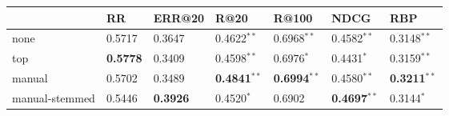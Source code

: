 \begin{tabular}{lllllll}
\toprule
{} &               RR &           ERR@20 &                    R@20 &                   R@100 &                    NDCG &                     RBP \\
\midrule
none           &           0.5717 &           0.3647 &           0.4622$^{**}$ &           0.6968$^{**}$ &           0.4582$^{**}$ &           0.3148$^{**}$ \\
top            &  \textbf{0.5778} &           0.3409 &           0.4598$^{**}$ &            0.6976$^{*}$ &            0.4431$^{*}$ &           0.3159$^{**}$ \\
manual         &           0.5702 &           0.3489 &  \textbf{0.4841}$^{**}$ &  \textbf{0.6994}$^{**}$ &           0.4580$^{**}$ &  \textbf{0.3211}$^{**}$ \\
manual-stemmed &           0.5446 &  \textbf{0.3926} &            0.4520$^{*}$ &                  0.6902 &  \textbf{0.4697}$^{**}$ &            0.3144$^{*}$ \\
\bottomrule
\end{tabular}
